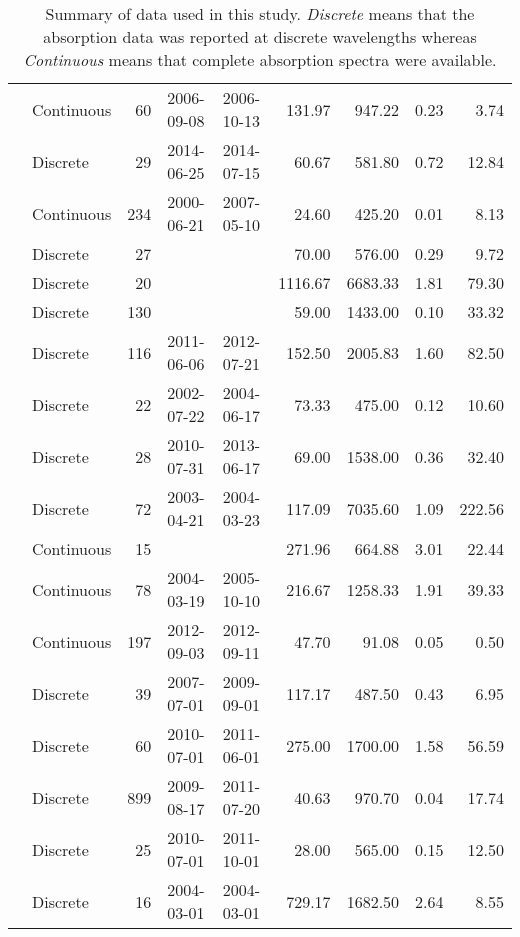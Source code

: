 \begin{table}[ht]
\begin{tabular}{llrllrrrr}
  \citet{Norman2011} & Continuous &  60 & 2006-09-08 & 2006-10-13 & 131.97 & 947.22 & 0.23 & 3.74 \\ 
  \citet{Oestreich2016} & Discrete &  29 & 2014-06-25 & 2014-07-15 & 60.67 & 581.80 & 0.72 & 12.84 \\ 
  \citet{Osburn2007} & Continuous & 234 & 2000-06-21 & 2007-05-10 & 24.60 & 425.20 & 0.01 & 8.13 \\ 
  \citet{Osburn2009} & Discrete &  27 &  &  & 70.00 & 576.00 & 0.29 & 9.72 \\ 
  \citet{Osburn2011} & Discrete &  20 &  &  & 1116.67 & 6683.33 & 1.81 & 79.30 \\ 
  \citet{Osburn2016} & Discrete & 130 &  &  & 59.00 & 1433.00 & 0.10 & 33.32 \\ 
  \citet{Polaris2012} & Discrete & 116 & 2011-06-06 & 2012-07-21 & 152.50 & 2005.83 & 1.60 & 82.50 \\ 
  \citet{Retamal2007} & Discrete &  22 & 2002-07-22 & 2004-06-17 & 73.33 & 475.00 & 0.12 & 10.60 \\ 
  \citet{Shen2014} & Discrete &  28 & 2010-07-31 & 2013-06-17 & 69.00 & 1538.00 & 0.36 & 32.40 \\ 
  \citet{Sickman2010} & Discrete &  72 & 2003-04-21 & 2004-03-23 & 117.09 & 7035.60 & 1.09 & 222.56 \\ 
  \citet{Stedmon2007a} & Continuous &  15 &  &  & 271.96 & 664.88 & 3.01 & 22.44 \\ 
  \citet{Stedmon2011} & Continuous &  78 & 2004-03-19 & 2005-10-10 & 216.67 & 1258.33 & 1.91 & 39.33 \\ 
  \citet{Stedmon2015} & Continuous & 197 & 2012-09-03 & 2012-09-11 & 47.70 & 91.08 & 0.05 & 0.50 \\ 
  \citet{Tehrani2013} & Discrete &  39 & 2007-07-01 & 2009-09-01 & 117.17 & 487.50 & 0.43 & 6.95 \\ 
  \citet{Wagner2015} & Discrete &  60 & 2010-07-01 & 2011-06-01 & 275.00 & 1700.00 & 1.58 & 56.59 \\ 
  \citet{Werdell2003} & Discrete & 899 & 2009-08-17 & 2011-07-20 & 40.63 & 970.70 & 0.04 & 17.74 \\ 
  \citet{Yang2013a} & Discrete &  25 & 2010-07-01 & 2011-10-01 & 28.00 & 565.00 & 0.15 & 12.50 \\ 
  \citet{Zhang2005} & Discrete &  16 & 2004-03-01 & 2004-03-01 & 729.17 & 1682.50 & 2.64 & 8.55 \\ 
   \hline
\end{tabular}
\endgroup
\caption{Summary of data used in this study. \textit{Discrete} means that the 
absorption data was reported at discrete wavelengths whereas 
\textit{Continuous} means that complete absorption spectra were available.} 
\end{table}

